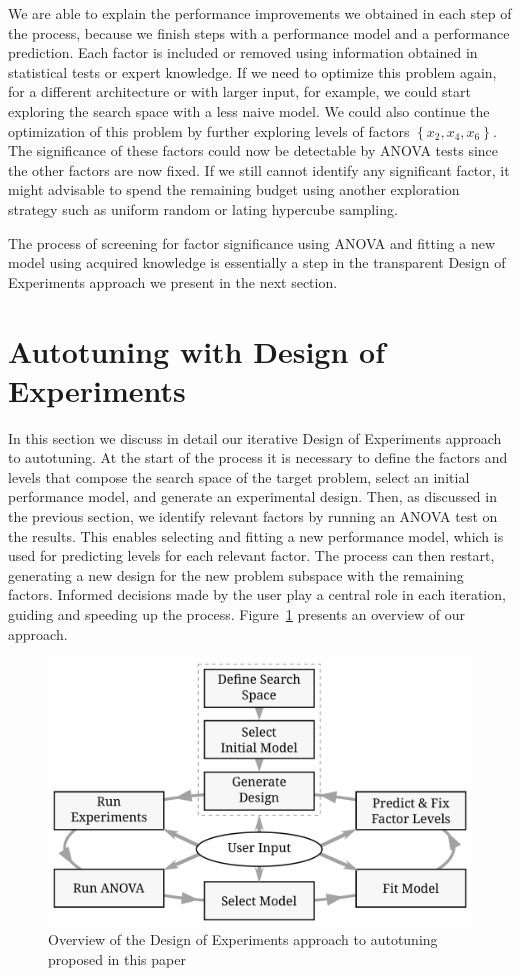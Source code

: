 \documentclass[conference]{IEEEtran}
\begin{document}
We are able to explain the performance improvements we obtained in each step of
the process, because we finish steps with a performance model and a performance
prediction. Each factor is included or removed using information obtained in
statistical tests or expert knowledge. If we need to optimize this problem
again, for a different architecture or with larger input, for example, we could
start exploring the search space with a less naive model. We could also continue
the optimization of this problem by further exploring levels of factors
\(\left\{x_2,x_4,x_6\right\}\). The significance of these factors could now be
detectable by ANOVA tests since the other factors are now fixed. If we still
cannot identify any significant factor, it might advisable to spend the
remaining budget using another exploration strategy such as uniform random or
lating hypercube sampling.

The process of screening for factor significance using ANOVA and fitting a
new model using acquired knowledge is essentially a step in the transparent
Design of Experiments approach we present in the next section.
\section{Autotuning with Design of Experiments}
\label{sec:org2d608ec}
In this section we discuss in detail our iterative Design of Experiments
approach to autotuning. At the start of the process it is necessary to define
the factors and levels that compose the search space of the target problem,
select an initial performance model, and generate an experimental design. Then,
as discussed in the previous section, we identify relevant factors by running an
ANOVA test on the results. This enables selecting and fitting a new performance
model, which is used for predicting levels for each relevant factor. The process
can then restart, generating a new design for the new problem subspace with the
remaining factors. Informed decisions made by the user play a central role in
each iteration, guiding and speeding up the process.
Figure~\ref{fig:org2bd2283} presents an overview of our approach.

\begin{figure}[b]\vspace{-.5cm}
\centering
\includegraphics[width=.95\columnwidth]{./img/doe_anova_strategy.pdf}
\caption{\label{fig:org2bd2283}
Overview of the Design of Experiments approach to autotuning proposed in this paper}
\end{figure}
\end{document}
